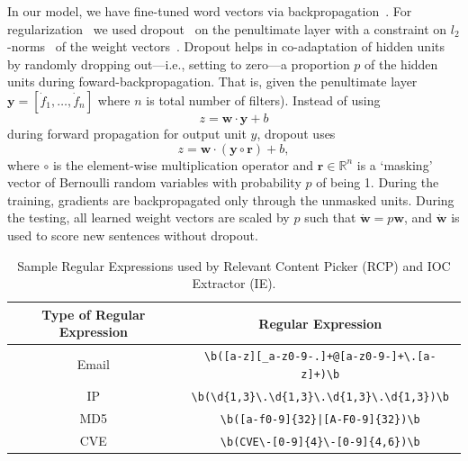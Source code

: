 In our model, we have fine-tuned word vectors via backpropagation~\cite{rumelhart}. For regularization~\cite{zou} we used dropout~\cite{srivastava} on the penultimate layer with a constraint on $l_2$-norms~\cite{ng} of the weight vectors~\cite{hinton}. Dropout helps in co-adaptation of hidden units by randomly dropping out---i.e., setting to zero---a proportion $p$ of the hidden units during foward-backpropagation. That is, given the penultimate layer $\mathbf{y} = [\dot{f}_1, \ldots, \dot{f}_n]$ where $n$ is total number of filters). Instead of using
\begin{equation}
z = \mathbf{w} \cdot \mathbf{y} + b
\end{equation}
during forward propagation for output unit $y$, dropout uses
\begin{equation}
z = \mathbf{w} \cdot (\mathbf{y}\circ\mathbf{r}) + b,
\end{equation}
where $\circ$ is the element-wise multiplication operator and $\mathbf{r} \in \mathbb{R}^n$ is a `masking' vector of Bernoulli random variables with probability $p$ of being 1. During the training, gradients\cite{friedman} are backpropagated only through the unmasked units. During the testing, all learned weight vectors are scaled by $p$ such that $\dot{\mathbf{w}} = p\mathbf{w}$, and $\dot{\mathbf{w}}$ is used  to score new sentences without dropout.

\begin{table}[tb]
\caption{Sample Regular Expressions used by Relevant Content Picker (RCP) and IOC Extractor (IE).} %
\centering %
\begin{tabular}{c c} %
\hline\hline %
Type of Regular Expression & Regular Expression \\ [0.5ex] %
\hline %
Email & \verb/\b([a-z][_a-z0-9-.]+@[a-z0-9-]+\.[a-z]+)\b/ \\ %
IP & \verb/\b(\d{1,3}\.\d{1,3}\.\d{1,3}\.\d{1,3})\b/ \\
MD5  & \verb/\b([a-f0-9]{32}|[A-F0-9]{32})\b/ \\ %
CVE  & \verb/\b(CVE\-[0-9]{4}\-[0-9]{4,6})\b/ \\[1ex]
\hline %
\end{tabular}
\label{table:reg} %
\end{table}


